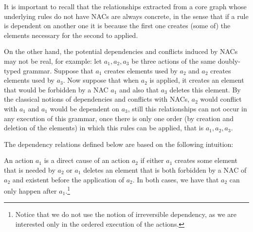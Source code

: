It is important to recall that the relationships extracted from a core graph whose underlying rules do not have NACs are always concrete, in the sense that if a rule is dependent on another one it is because the first one creates (some of) the elements necessary for the second to applied.

On the other hand, the potential dependencies and conflicts induced by NACs may not be real, for example: let $a_1, a_2, a_3$ be three actions of the same doubly-typed grammar. Suppose that $a_1$ creates elements used by $a_2$ and $a_2$ creates elements used by $a_3$. 
Now suppose that when $a_2$ is applied, it creates an element that would be forbidden by a NAC $a_1$ and also that $a_3$ deletes this element. By the classical notions of dependencies and conflicts with NACs, $a_2$ would conflict with $a_1$ and $a_1$ would be dependent on $a_3$, still this relationships can not occur in any execution of this grammar, once there is only one order (by creation and deletion of the elements) in which this rules can be applied, that is
$a_1,a_2,a_3$.

The dependency relations defined below are based on the following intuition:

\begin{intuition} An action $a_1$ is a direct cause of an action $a_2$ if either $a_1$ creates some element that is needed by $a_2$ or $a_1$ deletes an element that is both forbidden by a NAC of $a_2$ and existent before the application of $a_2$. In both cases, we have that $a_2$ can only happen after $a_1$.\footnote{Notice that we do not use the notion of irreversible dependency, as we are interested only in the ordered execution of the actions.} 
\end{intuition}

